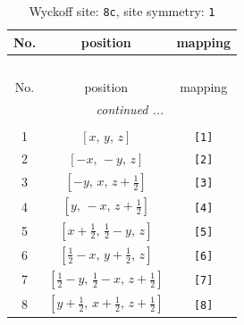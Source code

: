 \documentclass[fleqn,8pt]{jsarticle}
\begin{document}
\renewcommand{\arraystretch}{1.2}
\begin{longtable}{ccc}
\caption{Wyckoff site: {\tt 8c}, site symmetry: {\tt 1}}
 \\
 \hline \hline
No. & position & mapping \\ \hline \endfirsthead

\multicolumn{2}{l}{\tablename\ \thetable{}} \\
 \hline \hline
No. & position & mapping \\ \hline \endhead

 \hline \hline
\multicolumn{2}{r}{\footnotesize\it continued ...} \\ \endfoot

 \hline \hline
\multicolumn{2}{r}{} \\ \endlastfoot

1 & $\left[ x,\, y,\, z \right]$ & {\tt [1]} \\ \hline
2 & $\left[ - x,\, - y,\, z \right]$ & {\tt [2]} \\ \hline
3 & $\left[ - y,\, x,\, z + \frac{1}{2} \right]$ & {\tt [3]} \\ \hline
4 & $\left[ y,\, - x,\, z + \frac{1}{2} \right]$ & {\tt [4]} \\ \hline
5 & $\left[ x + \frac{1}{2},\, \frac{1}{2} - y,\, z \right]$ & {\tt [5]} \\ \hline
6 & $\left[ \frac{1}{2} - x,\, y + \frac{1}{2},\, z \right]$ & {\tt [6]} \\ \hline
7 & $\left[ \frac{1}{2} - y,\, \frac{1}{2} - x,\, z + \frac{1}{2} \right]$ & {\tt [7]} \\ \hline
8 & $\left[ y + \frac{1}{2},\, x + \frac{1}{2},\, z + \frac{1}{2} \right]$ & {\tt [8]} \\
\end{longtable}
\end{document}
